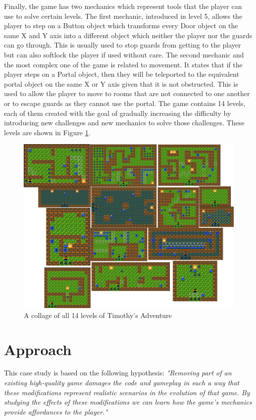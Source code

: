 Finally, the game has two mechanics which represent tools that the player can use to solve certain levels. The first mechanic, introduced in level 5, allows the player to step on a Button object which transforms every Door object on the same X and Y axis into a different object which neither the player nor the guards can go through. This is usually used to stop guards from getting to the player but can also softlock the player if used without care. The second mechanic and the most complex one of the game is related to movement. It states that if the player steps on a Portal object, then they will be teleported to the equivalent portal object on the same X or Y axis given that it is not obstructed. This is used to allow the player to move to rooms that are not connected to one another or to escape guards as they cannot use the portal. The game contains 14 levels, each of them created with the goal of gradually increasing the difficulty by introducing new challenges and new mechanics to solve those challenges. These levels are shown in Figure \ref{fig:case_game_levels}.

\begin{figure}[!t]
    \centering
    \includegraphics[width=1\textwidth]{images/case_results/Case_game_levels.png}
    \caption{A collage of all 14 levels of Timothy's Adventure}
    \label{fig:case_game_levels}
\end{figure}

\section{Approach}
This case study is based on the following hypothesis:\newline
\quad\textit{"Removing part of an existing high-quality game damages the code and gameplay in such a way that these modifications represent realistic scenarios in the evolution of that game. By studying the effects of these modifications we can learn how the game's mechanics provide affordances to the player."}

